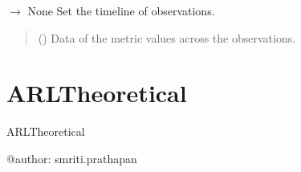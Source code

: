 \documentclass[letterpaper,10pt,oneside,english]{sphinxmanual}
\begin{document}
\begin{fulllineitems}
\begin{fulllineitems}
\label{\detokenize{ref_cusum:package.cusum.CUSUM.set_timeline}}
\pysigstartsignatures
\pysiglinewithargsret
{}
{}
{{ $\rightarrow$ None}}
\pysigstopsignatures
\sphinxAtStartPar
Set the timeline of observations.
\begin{quote}\begin{description}
\sphinxAtStartPar
{} () \textendash{} Data of the metric values across the observations.

\end{description}\end{quote}

\end{fulllineitems}


\end{fulllineitems}


\sphinxstepscope


\section{ARLTheoretical}
\label{\detokenize{ref_theoretical:module-package.ARLTheoretical}}\label{\detokenize{ref_theoretical:arltheoretical}}\label{\detokenize{ref_theoretical::doc}}
\sphinxAtStartPar
ARLTheoretical

\sphinxAtStartPar
@author: smriti.prathapan
\end{document}

